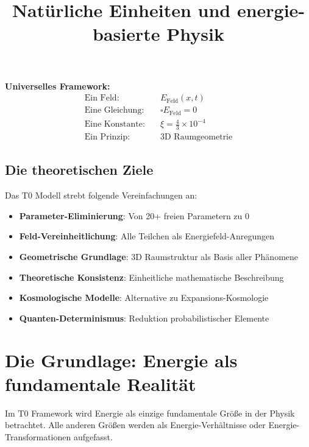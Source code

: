 \documentclass[12pt,a4paper]{report}
\begin{document}
	\begin{formel}
		\textbf{Universelles Framework:}
		\begin{align}
			\text{Ein Feld:} \quad &E_{\text{Feld}}(x,t) \\
			\text{Eine Gleichung:} \quad &\square E_{\text{Feld}} = 0 \\
			\text{Eine Konstante:} \quad &\xi = \frac{4}{3} \times 10^{-4} \\
			\text{Ein Prinzip:} \quad &\text{3D Raumgeometrie}
		\end{align}
	\end{formel}
	
	\subsection{Die theoretischen Ziele}
	
	Das T0 Modell strebt folgende Vereinfachungen an:
	
	\begin{itemize}
		\item \textbf{Parameter-Eliminierung}: Von 20+ freien Parametern zu 0
		\item \textbf{Feld-Vereinheitlichung}: Alle Teilchen als Energiefeld-Anregungen
		\item \textbf{Geometrische Grundlage}: 3D Raumstruktur als Basis aller Phänomene
		\item \textbf{Theoretische Konsistenz}: Einheitliche mathematische Beschreibung
		\item \textbf{Kosmologische Modelle}: Alternative zu Expansions-Kosmologie
		\item \textbf{Quanten-Determinismus}: Reduktion probabilistischer Elemente
	\end{itemize}
	
	\title{Natürliche Einheiten und energie-basierte Physik}
\maketitle
	
	\section{Die Grundlage: Energie als fundamentale Realität}
	
	\begin{prinzip}
		Im T0 Framework wird Energie als einzige fundamentale Größe in der Physik betrachtet. Alle anderen Größen werden als Energie-Verhältnisse oder Energie-Transformationen aufgefasst.
	\end{prinzip}
	
\end{document}
